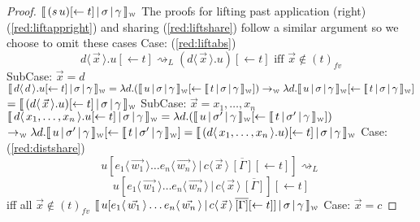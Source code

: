 \documentclass[a4paper,UKenglish,cleveref, autoref]{lipics-v2019}
\newcommand{\fv}[1]{(#1)_{fv}}
\newcommand{\abs}[2]{\lambda #1 . #2}
\newcommand{\app}[2]{#1 \, #2}
\newcommand{\fake}[3]{#1 \langle \, #2 \, \rangle . #3}
\newcommand{\share}[3]{#1 [#2 \leftarrow #3]}
\newcommand{\dist}[5]{#1 [ #2 \, \vert \, \fakedist{#4}{#5} \, #3 ]}
\newcommand{\fakedist}[2]{#1 \langle \, #2 \, \rangle}
\newcommand{\weaksymbol}{\mbox{\tiny $\mathcal{W}$}}
\newcommand{\readweakwmap}[3]{\llbracket \, #1 \, \vert \, #2 \, \vert \, #3  \, \rrbracket_{\weaksymbol} }
\begin{document}
\begin{proof}
$\readweakwmap{(\app{s}{u}) \share{}{}{t}}{\sigma}{\gamma}$
\newline
\newline
\newline
The proofs for lifting past application (right) (\ref{red:liftappright}) and sharing (\ref{red:liftshare}) follow a similar argument so we choose to omit these cases
\newline
\newline
Case: (\ref{red:liftabs})
$$\fake{d}{\vec{x}}{u  \share{}{}{t}} \rightsquigarrow_{L} (\fake{d}{\vec{x}}{u})  \share{}{}{t} \text{ iff $\vec{x} \not\in \fv{t}$}$$
\indent SubCase: $\vec{x} = d$
\newline
$\readweakwmap{\fake{d}{d}{u  \share{}{}{t}}}{\sigma}{\gamma} = \abs{d}{( \readweakwmap{u}{\sigma}{\gamma} \share{}{}{\readweakwmap{t}{\sigma}{\gamma}})} \rightarrow_{\weaksymbol} \abs{d}{ \readweakwmap{u}{\sigma}{\gamma}} \share{}{}{\readweakwmap{t}{\sigma}{\gamma}}$
\newline
$= \readweakwmap{(\fake{d}{\vec{x}}{u})  \share{}{}{t}}{\sigma}{\gamma}$
\newline
\newline
\indent SubCase: $\vec{x} = x_{1}, \dots, x_{n}$
\newline
$\readweakwmap{\fake{d}{x_{1}, \dots, x_{n}}{u  \share{}{}{t}}}{\sigma}{\gamma} = \abs{d}{( \readweakwmap{u}{\sigma'}{\gamma} \share{}{}{\readweakwmap{t}{\sigma'}{\gamma}} )}$
\newline
$\rightarrow_{\weaksymbol} \abs{d}{ \readweakwmap{u}{\sigma'}{\gamma}} \share{}{}{\readweakwmap{t}{\sigma'}{\gamma}} = \readweakwmap{(\fake{d}{x_{1}, \dots, x_{n}}{u}) \share{}{}{t}}{\sigma}{\gamma}$
\newline
\newline
Case: (\ref{red:distshare})
$$\dist{u}{\fakedist{e_{1}}{\vec{w_{1}}} \dots \fakedist{e_{n}}{\vec{w_{n}}}}{\overline{[\Gamma]} \share{}{}{t}}{c}{\vec{x}} \rightsquigarrow_{L}$$ 
$$\dist{u}{\fakedist{e_{1}}{\vec{w_{1}}} \dots \fakedist{e_{n}}{\vec{w_{n}}}}{\overline{[\Gamma]}}{c}{\vec{x}} \share{}{}{t}$$
iff all $\vec{x} \not\in \fv{t}$
\newline
\newline
$\readweakwmap{\dist{u}{\fakedist{e_{1}}{\vec{w_{1}}} \dots \fakedist{e_{n}}{\vec{w_{n}}}}{\overline{[\Gamma]} \share{}{}{t}}{c}{\vec{x}}}{\sigma}{\gamma}$
\newline
\indent Case: $\vec{x} = c$

\end{proof}
\end{document}
